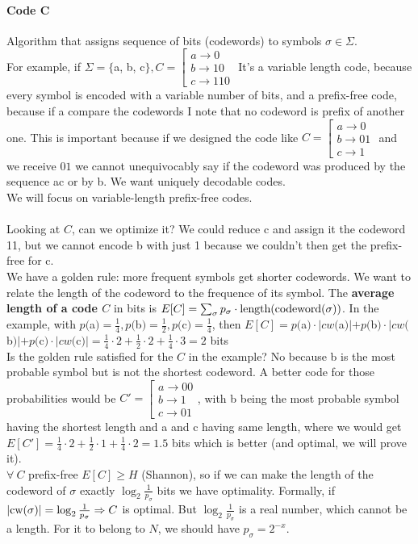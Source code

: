 \documentclass[10pt]{report}
\begin{document}
\paragraph{Code C} Algorithm that assigns sequence of bits (codewords) to symbols $\sigma\in\Sigma$.\\
For example, if $\Sigma = \{$a, b, c$\}, C = \left[\begin{array}{l}
a\rightarrow 0\\
b\rightarrow 10\\
c\rightarrow 110
\end{array}\right.$ It's a variable length code, because every symbol is encoded with a variable number of bits, and a prefix-free code, because if a compare the codewords I note that no codeword is prefix of another one. This is important because if we designed the code like $C = \left[\begin{array}{l}
a\rightarrow 0\\
b\rightarrow 01\\
c\rightarrow 1
\end{array}\right.$ and we receive $01$ we cannot unequivocably say if the codeword was produced by the sequence ac or by b. We want uniquely decodable codes.\\
We will focus on variable-length prefix-free codes.\\\\
Looking at $C$, can we optimize it? We could reduce c and assign it the codeword 11, but we cannot encode b with just 1  because we couldn't then get the prefix-free for c.\\
We have a golden rule: more frequent symbols get shorter codewords. We want to relate the length of the codeword to the frequence of its symbol. The \textbf{average length of a code $C$} in bits is $E[C] = \sum_\sigma p_\sigma\cdot\hbox{length}(\hbox{codeword}(\sigma))$. In the example, with $p($a$) = \frac{1}{4}, p($b$) = \frac{1}{2}, p($c$) = \frac{1}{4}$, then $E[C] = p($a$)\cdot|cw($a$)| + p($b$)\cdot|cw($b$)| + p($c$)\cdot|cw($c$)| = \frac{1}{4}\cdot 2 + \frac{1}{2}\cdot 2 + \frac{1}{4}\cdot 3 = 2$ bits\\
Is the golden rule satisfied for the $C$ in the example? No because b is the most probable symbol but is not the shortest codeword. A better code for those probabilities would be $C' = \left[\begin{array}{l}
a\rightarrow 00\\
b\rightarrow 1\\
c\rightarrow 01
\end{array}\right.$, with b being the most probable symbol having the shortest length and a and c having same length, where we would get $E[C'] = \frac{1}{4}\cdot2 + \frac{1}{2}\cdot1 + \frac{1}{4}\cdot2 = 1.5$ bits which is better (and optimal, we will prove it).\\
$\forall\:C$ prefix-free $E[C] \geq H$ (Shannon), so if we can make the length of the codeword of $\sigma$ exactly $\log_2 \frac{1}{p_\sigma}$ bits we have optimality. Formally, if $|\hbox{cw}(\sigma)| = \log_2\frac{1}{p_\sigma} \Rightarrow C$ is optimal. But $\log_2\frac{1}{p_\sigma}$ is a real number, which cannot be a length. For it to belong to $N$, we should have $p_\sigma = 2^{-x}$.
\end{document}

